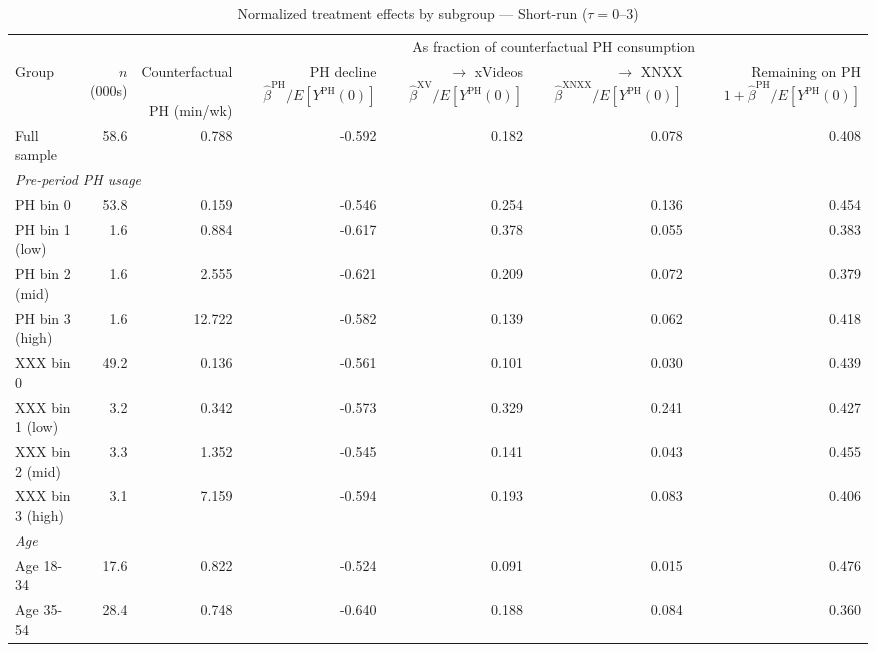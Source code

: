 \begin{landscape}
\begin{table}[htbp]
\centering
\caption{Normalized treatment effects by subgroup --- Short-run ($\tau = 0$--$3$)}
\label{tab:normalized_het_st}
\begin{tabular}{lrr rrrr}
\toprule
& & & \multicolumn{4}{c}{As fraction of counterfactual PH consumption} \\
\cmidrule(lr){4-7}
Group & $n$ (000s) & \shortstack{Counterfactual \\\\ PH (min/wk)} & \shortstack{PH decline \\\\ $\hat{\beta}^{\text{PH}}/E[Y^{\text{PH}}(0)]$} & \shortstack{$\to$ xVideos \\\\ $\hat{\beta}^{\text{XV}}/E[Y^{\text{PH}}(0)]$} & \shortstack{$\to$ XNXX \\\\ $\hat{\beta}^{\text{XNXX}}/E[Y^{\text{PH}}(0)]$} & \shortstack{Remaining on PH \\\\ $1 + \hat{\beta}^{\text{PH}}/E[Y^{\text{PH}}(0)]$}
\\ \midrule
Full sample & 58.6 & 0.788 & -0.592 & 0.182 & 0.078 & 0.408 \\
\midrule
\multicolumn{7}{l}{\textit{Pre-period PH usage}} \\
PH bin 0 & 53.8 & 0.159 & -0.546 & 0.254 & 0.136 & 0.454 \\
PH bin 1 (low) & 1.6 & 0.884 & -0.617 & 0.378 & 0.055 & 0.383 \\
PH bin 2 (mid) & 1.6 & 2.555 & -0.621 & 0.209 & 0.072 & 0.379 \\
PH bin 3 (high) & 1.6 & 12.722 & -0.582 & 0.139 & 0.062 & 0.418 \\
XXX bin 0 & 49.2 & 0.136 & -0.561 & 0.101 & 0.030 & 0.439 \\
XXX bin 1 (low) & 3.2 & 0.342 & -0.573 & 0.329 & 0.241 & 0.427 \\
XXX bin 2 (mid) & 3.3 & 1.352 & -0.545 & 0.141 & 0.043 & 0.455 \\
XXX bin 3 (high) & 3.1 & 7.159 & -0.594 & 0.193 & 0.083 & 0.406 \\
\midrule
\multicolumn{7}{l}{\textit{Age}} \\
Age 18-34 & 17.6 & 0.822 & -0.524 & 0.091 & 0.015 & 0.476 \\
Age 35-54 & 28.4 & 0.748 & -0.640 & 0.188 & 0.084 & 0.360 \\

\end{tabular}
\end{table}
\end{landscape}
